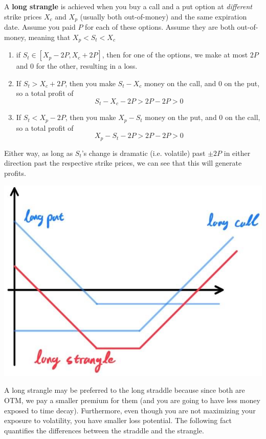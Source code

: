 \documentclass{article}
\begin{document}
\begin{definition}
A \textbf{long strangle} is achieved when you buy a call and a put option at \textit{different} strike prices $X_c$ and $X_p$ (usually both out-of-money) and the same expiration date. Assume you paid $P$ for each of these options. Assume they are both out-of-money, meaning that $X_p < S_t < X_c$
\begin{enumerate}
    \item if $S_t \in [X_p - 2P, X_c + 2P]$, then for one of the options, we make at most $2P$ and $0$ for the other, resulting in a loss. 
    \item If $S_t > X_c + 2P$, then you make $S_t - X_c$ money on the call, and $0$ on the put, so a total profit of 
    \[S_t - X_c - 2P > 2P - 2P > 0\]
    
    \item If $S_t < X_p - 2P$, then you make $X_p - S_t$ money on the put, and $0$ on the call, so a total profit of 
    \[X_p - S_t - 2P > 2P - 2P > 0\]
\end{enumerate}
Either way, as long as $S_t$'s change is dramatic (i.e. volatile) past $\pm 2P$ in either direction past the respective strike prices, we can see that this will generate profits. 
\begin{center}
    \includegraphics[scale=0.3]{img/long_strangle.jpg}
\end{center}
\end{definition}

A long strangle may be preferred to the long straddle because since both are OTM, we pay a smaller premium for them (and you are going to have less money exposed to time decay). Furthermore, even though you are not maximizing your exposure to volatility, you have smaller loss potential. The following fact quantifies the differences between the straddle and the strangle. 
\end{document}
